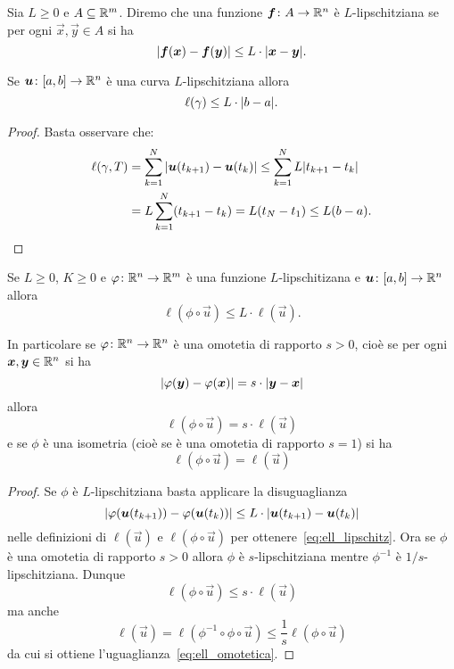 \begin{definition}
Sia $L\ge 0$ e $A\subseteq {\mathbb R}^m$.
Diremo che una funzione $\boldsymbol f\colon A \to {\mathbb R}^n$ 
è $L$-lipschitziana se per ogni $\vec x, \vec y\in A$ si ha 
\[
  {\left|\boldsymbol f(\boldsymbol x)-\boldsymbol f(\boldsymbol y)\right|} \le L \cdot {\left|\boldsymbol x-\boldsymbol y\right|}.  
\]
\end{definition}

\begin{lemma}
  Se $\boldsymbol u \colon [a,b]\to {\mathbb R}^n$ è una curva 
  $L$-lipschitziana allora 
  \[
   \ell(\gamma) \le L \cdot {\left|b-a\right|}.  
  \]
\end{lemma}
\begin{proof} Basta osservare che:
  \begin{align*}
  \ell(\gamma, T) 
  &= \sum_{k=1}^N {\left|\boldsymbol u(t_{k+1})-\boldsymbol u(t_{k})\right|}
  \le \sum_{k=1}^N L {\left|t_{k+1}-t_k\right|} \\
  &= L \sum_{k=1}^N (t_{k+1} - t_k)
  = L (t_N-t_1) 
  \le L (b-a).
  \end{align*}
\end{proof}

\begin{lemma}
  Se $L\ge 0$, $K\ge 0$ e $\varphi\colon {\mathbb R}^n \to {\mathbb R}^m$ è una funzione 
  $L$-lipschitizana
  e $\boldsymbol u\colon [a,b]\to {\mathbb R}^n$
  allora 
  \begin{equation}\label{eq:ell_lipschitz}
    \ell(\phi\circ \vec u) \le L \cdot \ell(\vec u).  
  \end{equation}
  
  In particolare se $\varphi\colon{\mathbb R}^n\to{\mathbb R}^n$ è una omotetia di rapporto $s> 0$, 
  cioè se per ogni $\boldsymbol x, \boldsymbol y \in {\mathbb R}^n$ si ha 
  \[
     {\left|\varphi(\boldsymbol y) - \varphi(\boldsymbol x)\right|} = s \cdot {\left|\boldsymbol y - \boldsymbol x\right|}
  \]
  allora 
  \begin{equation}\label{eq:ell_omotetica}
    \ell(\phi\circ \vec u) = s\cdot \ell(\vec u)  
  \end{equation}
  e se $\phi$ è una isometria (cioè se è una omotetia di rapporto $s=1$) si ha 
  \begin{equation}\label{eq:ell_isometrica}
    \ell(\phi\circ \vec u) = \ell(\vec u)  
  \end{equation}
\end{lemma}
\begin{proof}
Se $\phi$ è $L$-lipschitziana basta applicare la disuguaglianza
\[
  {\left|\varphi(\boldsymbol u(t_{k+1})) - \varphi(\boldsymbol u(t_k))\right|}
  \le L\cdot {\left|\boldsymbol u(t_{k+1}) - \boldsymbol u(t_k)\right|}  
\]
nelle definizioni di $\ell(\vec u)$ e $\ell(\phi\circ \vec u)$
per ottenere~\eqref{eq:ell_lipschitz}.
Ora se $\phi$ è una omotetia di rapporto $s>0$
allora $\phi$ è $s$-lipschitziana mentre 
$\phi^{-1}$ è $1/s$-lipschitziana. 
Dunque 
\[
   \ell(\phi\circ \vec u) \le s\cdot \ell(\vec u)
\]
ma anche  
\[
  \ell(\vec u) = \ell(\phi^{-1}\circ \phi \circ \vec u)
  \le \frac 1 s \ell(\phi\circ \vec u)
\]
da cui si ottiene l'uguaglianza~\eqref{eq:ell_omotetica}.
\end{proof}

